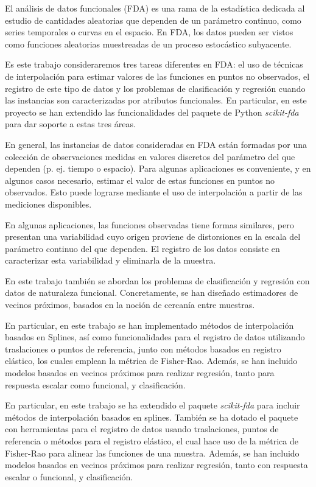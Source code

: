 El análisis de datos funcionales (FDA) es una rama de la estadística dedicada
al estudio de cantidades aleatorias que dependen de un parámetro continuo,
como series temporales o curvas en el espacio. En FDA, los datos pueden ser
vistos como funciones aleatorias muestreadas de un proceso
estocástico subyacente.

Es este trabajo consideraremos tres tareas diferentes en FDA:
el uso de técnicas de interpolación para estimar valores de las funciones
en puntos no observados,
el registro de este tipo de datos
y los problemas de clasificación y regresión cuando las instancias
son caracterizadas por atributos funcionales.
En particular, en este proyecto se han extendido las funcionalidades del
paquete de Python \textit{scikit-fda} para dar soporte a estas tres áreas.

En general, las instancias de datos consideradas en FDA están formadas por una
colección de observaciones medidas en valores discretos del parámetro del
que dependen (p. ej. tiempo o espacio).
Para algunas aplicaciones es conveniente, y en algunos casos necesario,
estimar el valor de estas funciones en puntos no observados.
Esto puede lograrse mediante el uso de interpolación a partir de las
mediciones disponibles.

En algunas aplicaciones, las funciones observadas tiene formas similares,
pero presentan una variabilidad cuyo origen proviene de
distorsiones en la escala del parámetro continuo del que
dependen. El registro de los datos consiste en caracterizar esta variabilidad
y eliminarla de la muestra.


En este trabajo también se abordan los problemas de clasificación y regresión
con datos de naturaleza funcional. Concretamente, se han diseñado
estimadores de vecinos próximos, basados en la noción de cercanía entre muestras.

En particular, en este trabajo se han implementado métodos de
interpolación basados en Splines, así como funcionalidades para el
registro de datos utilizando traslaciones o puntos de referencia,
junto con métodos basados en registro elástico, los cuales emplean la métrica
de Fisher-Rao. Además, se han incluido modelos basados en vecinos próximos
para realizar regresión, tanto para respuesta escalar como funcional, y
clasificación.

En particular, en este trabajo se ha extendido el paquete \textit{scikit-fda}
para incluir métodos de interpolación basados en splines. También se ha dotado
el paquete con herramientas para el registro de datos usando traslaciones,
puntos de referencia o métodos para el registro elástico, el cual hace uso
de la métrica de Fisher-Rao para alinear las funciones de una muestra.
Además, se han incluido modelos basados en vecinos próximos para realizar
regresión, tanto con respuesta escalar o funcional, y clasificación.
